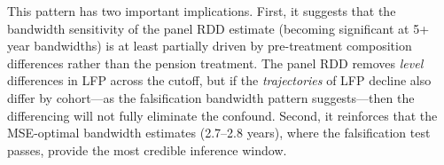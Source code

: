 \documentclass[12pt]{article}
\begin{document}
This pattern has two important implications. First, it suggests that the bandwidth sensitivity of the panel RDD estimate (becoming significant at 5+ year bandwidths) is at least partially driven by pre-treatment composition differences rather than the pension treatment. The panel RDD removes \textit{level} differences in LFP across the cutoff, but if the \textit{trajectories} of LFP decline also differ by cohort---as the falsification bandwidth pattern suggests---then the differencing will not fully eliminate the confound. Second, it reinforces that the MSE-optimal bandwidth estimates (2.7--2.8 years), where the falsification test passes, provide the most credible inference window.
\end{document}
